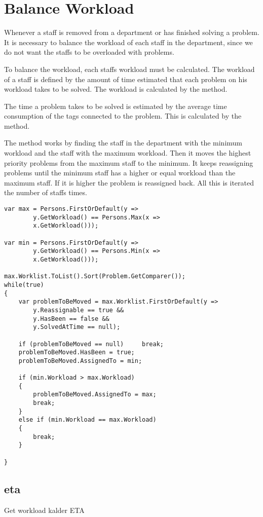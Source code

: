 \section{Balance Workload}
Whenever a staff is removed from a department or has finished solving a problem. 
It is necessary to balance the workload of each staff in the department, since we do not want the staffs to be overloaded with problems. 

To balance the workload, each staffs workload must be calculated. 
The workload of a staff is defined by the amount of time estimated that each problem on his workload takes to be solved. The workload is calculated by the  method.

The time a problem takes to be solved is estimated by the average time consumption of the tags connected to the problem. This is calculated by the  method.

The  method works by finding the staff in the department with the minimum workload and the staff with the maximum workload. Then it moves the highest priority problems from the maximum staff to the minimum. It keeps reassigning problems until the minimum staff has a higher or equal workload than the maximum staff. If it is higher the problem is reassigned back. All this is iterated the number of staffs times. 

\begin{lstlisting}[style=sourceCode, caption=\myCaption{To be}]
var max = Persons.FirstOrDefault(y => 	
		y.GetWorkload() == Persons.Max(x => 
		x.GetWorkload()));                  

var min = Persons.FirstOrDefault(y => 
		y.GetWorkload() == Persons.Min(x => 
		x.GetWorkload()));
    
max.Worklist.ToList().Sort(Problem.GetComparer());             
while(true)
{
    var problemToBeMoved = max.Worklist.FirstOrDefault(y => 
		y.Reassignable == true && 
		y.HasBeen == false && 
		y.SolvedAtTime == null);
                   
    if (problemToBeMoved == null)     break; 
    problemToBeMoved.HasBeen = true;
    problemToBeMoved.AssignedTo = min;
    
    if (min.Workload > max.Workload)
    {
    	problemToBeMoved.AssignedTo = max;
    	break;
    }
    else if (min.Workload == max.Workload)
    {
		break;
    }
  
} 
\end{lstlisting}

\subsection{eta}
\label{}


Get workload kalder ETA